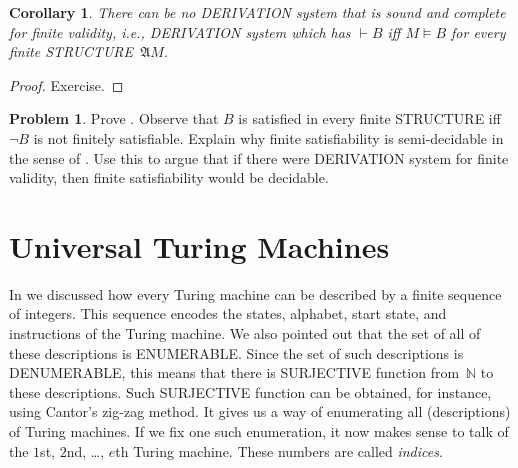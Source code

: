\documentclass[10pt,a4paper]{article}
\makeatletter
\newcommand*{\olup}[1]{\MakeUppercase{#1}}
\theoremstyle{plain}
\newtheorem{cor}[thm]{Corollary}
\theoremstyle{definition}
\newtheorem{prob}{Problem}[section]
\theoremstyle{remark}
\newcommand*{\olfileid}[3]{}
\newcommand*{\olsection}[1]{\section*{#1}}
\newcommand*{\olchapter}[3]{}
\newcommand*{\olimport}[1]{}
\newcommand*{\ollabel}[1]{\label{#1}}
\newcommand{\olref}{\@ifnextchar[{\olref@i}{\olref@final}}
\def\olref@i[#1]{\@ifnextchar[{\olref@ii}{\olref@final}}
\def\olref@ii[#1]{\@ifnextchar[{\olref@iii}{\olref@final}}
\def\olref@iii[#1]{\olref@final}
\def\olref@final#1{\ref{#1}}
\providecommand{\Proves}{\mathrel{\vdash}}
\providecommand{\Struct}{\ensuremath{\mathfrak{A}}}
\providecommand{\Sat}[2]{\ensuremath{#1 \models #2}}
\providecommand{\Nat}{\ensuremath{\mathbb{N}}}
\makeatother
\begin{document}
\begin{cor}\ollabel{cor:fproof-incomp}%
  There can be no \olup{derivation} system that is sound and complete for
  \emph{finite} validity, i.e., \olup{derivation} system which has $\Proves B$
  iff $\Sat{M}{B}$ for every finite \olup{structure}~$\Struct{M}$.
\end{cor}

\begin{proof}
  Exercise.
\end{proof}

\begin{prob}
  Prove \olref[tur][und][tra]{cor:fproof-incomp}. Observe that $B$ is
  satisfied in every finite \olup{structure} iff $\lnot B$ is not
  finitely satisfiable.  Explain why finite satisfiability is
  semi-decidable in the sense of
  \olref[tur][und][uns]{thm:valid-ce}. Use this to argue that if
  there were \olup{derivation} system for finite validity, then finite
  satisfiability would be decidable.
\end{prob}






\olchapter{tur}{und}{Undecidability}

\olimport{introduction}

\olimport{enumerating-tms}

\olimport{universal-tm}

\olimport{halting-problem}

\olimport{decision-problem}

\olimport{representing-tms}

\olimport{verification}

\olimport{unsolvability-decision-problem}

\olimport{trakhtenbrot}

\OLEndChapterHook





\olfileid{tur}{und}{uni}
\olsection{Universal Turing Machines}

In \olref[enu]{sec} we discussed how every Turing machine can be
described by a finite sequence of integers. This sequence encodes the
states, alphabet, start state, and instructions of the Turing machine.
We also pointed out that the set of all of these descriptions is
\olup{enumerable}. Since the set of such descriptions is \olup{denumerable},
this means that there is \olup{surjective} function from~$\Nat$ to
these descriptions. Such \olup{surjective} function can be obtained, for
instance, using Cantor's zig-zag method.  It gives us a way of
enumerating all (descriptions) of Turing machines. If we fix one such
enumeration, it now makes sense to talk of the $1$st, $2$nd, \dots,
$e$th Turing machine.  These numbers are called \emph{indices}.
\end{document}
